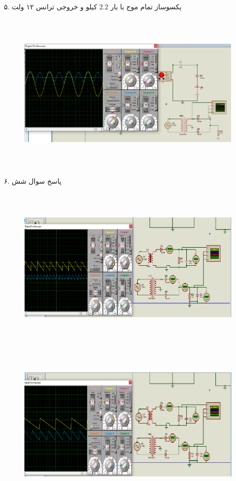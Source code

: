 \documentclass[12pt]{article}
\begin{document}
۵. یکسوساز تمام‌ موج با بار $2.2$ کیلو و خروجی ترانس ۱۲ ولت
\begin{figure}[H]
	\begin{center}
		\includegraphics[width=\textwidth, height=8cm]{./images/8.8}
	\end{center}
\end{figure}

۶. پاسخ سوال شش
\begin{figure}[H]
	\begin{center}
		\includegraphics[width=\textwidth, height=8cm]{./images/8.9}
	\end{center}
\end{figure}
\begin{figure}[H]
	\begin{center}
		\includegraphics[width=\textwidth, height=8cm]{./images/8.10}
	\end{center}
\end{figure}
\end{document}
